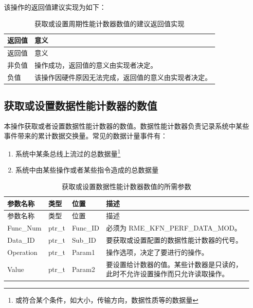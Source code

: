 该操作的返回值建议实现为如下：

\begin{xltabular}{\textwidth}{@{}>{\hsize\raggedright\arraybackslash}X>{\hsize\raggedright\arraybackslash}X@{}}
\caption{获取或设置周期性能计数器数值的建议返回值实现}\label{tab:8-65-get-or-set-cycle-performance-counter-suggested-return-values}\\
\toprule
返回值 & 意义\tabularnewline
\endfirsthead
\toprule
返回值 & 意义\tabularnewline
\midrule
\endhead
\bottomrule
\endlastfoot
    非负值 & 操作成功，返回值的意义由实现者决定。\tabularnewline
    负值 & 该操作因硬件原因无法完成，返回值的意义由实现者决定。\tabularnewline
\end{xltabular}

\subsection{获取或设置数据性能计数器的数值}\label{subsec:8-get-or-set-data-performance-counter}
\nopagebreak[4]

本操作获取或者设置数据性能计数器的数值。数据性能计数器负责记录系统中某些事件带来的累计数据交换量。常见的数据计量事件有：

\begin{enumerate}
\def\labelenumi{\arabic{enumi}.}
\item
  系统中某条总线上流过的总数据量\footnote{或符合某个条件，如大小，传输方向，数据性质等的数据量}
\item
  系统中由某些操作或者某些指令造成的总数据量
\end{enumerate}

\begin{xltabular}{\textwidth}{@{}>{\hsize\raggedright\arraybackslash}X>{\hsize\raggedright\arraybackslash}X>{\hsize\raggedright\arraybackslash}X>{\hsize\raggedright\arraybackslash}X@{}}
\caption{获取或设置数据性能计数器数值的所需参数}\label{tab:8-66-get-or-set-data-performance-counter-parameters}\\
\toprule
参数名称 & 类型 & 位置 & 描述\tabularnewline
\endfirsthead
\toprule
参数名称 & 类型 & 位置 & 描述\tabularnewline
\midrule
\endhead
\bottomrule
\endlastfoot
Func\_Num & ptr\_t & Func\_ID & 必须为 RME\_KFN\_PERF\_DATA\_MOD。\tabularnewline
Data\_ID & ptr\_t & Sub\_ID &
要获取或设置配置的数据性能计数器的代号。\tabularnewline
Operation & ptr\_t & Param1 &
操作选项，决定了要进行的操作。\tabularnewline
Value & ptr\_t & Param2 &
要设置给计数器的值。某些计数器是只读的，此时不允许设置操作而只允许读取操作。\tabularnewline
\end{xltabular}

